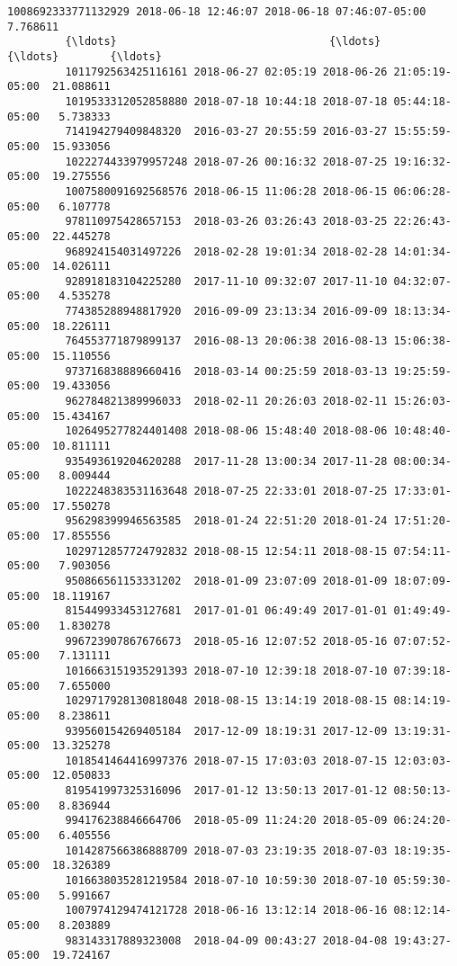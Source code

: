 \documentclass[11pt]{article}
\begin{document}
\begin{Verbatim}[commandchars=\\\{\}]
         1008692333771132929 2018-06-18 12:46:07 2018-06-18 07:46:07-05:00   7.768611   
         {\ldots}                                 {\ldots}                       {\ldots}        {\ldots}   
         1011792563425116161 2018-06-27 02:05:19 2018-06-26 21:05:19-05:00  21.088611   
         1019533312052858880 2018-07-18 10:44:18 2018-07-18 05:44:18-05:00   5.738333   
         714194279409848320  2016-03-27 20:55:59 2016-03-27 15:55:59-05:00  15.933056   
         1022274433979957248 2018-07-26 00:16:32 2018-07-25 19:16:32-05:00  19.275556   
         1007580091692568576 2018-06-15 11:06:28 2018-06-15 06:06:28-05:00   6.107778   
         978110975428657153  2018-03-26 03:26:43 2018-03-25 22:26:43-05:00  22.445278   
         968924154031497226  2018-02-28 19:01:34 2018-02-28 14:01:34-05:00  14.026111   
         928918183104225280  2017-11-10 09:32:07 2017-11-10 04:32:07-05:00   4.535278   
         774385288948817920  2016-09-09 23:13:34 2016-09-09 18:13:34-05:00  18.226111   
         764553771879899137  2016-08-13 20:06:38 2016-08-13 15:06:38-05:00  15.110556   
         973716838889660416  2018-03-14 00:25:59 2018-03-13 19:25:59-05:00  19.433056   
         962784821389996033  2018-02-11 20:26:03 2018-02-11 15:26:03-05:00  15.434167   
         1026495277824401408 2018-08-06 15:48:40 2018-08-06 10:48:40-05:00  10.811111   
         935493619204620288  2017-11-28 13:00:34 2017-11-28 08:00:34-05:00   8.009444   
         1022248383531163648 2018-07-25 22:33:01 2018-07-25 17:33:01-05:00  17.550278   
         956298399946563585  2018-01-24 22:51:20 2018-01-24 17:51:20-05:00  17.855556   
         1029712857724792832 2018-08-15 12:54:11 2018-08-15 07:54:11-05:00   7.903056   
         950866561153331202  2018-01-09 23:07:09 2018-01-09 18:07:09-05:00  18.119167   
         815449933453127681  2017-01-01 06:49:49 2017-01-01 01:49:49-05:00   1.830278   
         996723907867676673  2018-05-16 12:07:52 2018-05-16 07:07:52-05:00   7.131111   
         1016663151935291393 2018-07-10 12:39:18 2018-07-10 07:39:18-05:00   7.655000   
         1029717928130818048 2018-08-15 13:14:19 2018-08-15 08:14:19-05:00   8.238611   
         939560154269405184  2017-12-09 18:19:31 2017-12-09 13:19:31-05:00  13.325278   
         1018541464416997376 2018-07-15 17:03:03 2018-07-15 12:03:03-05:00  12.050833   
         819541997325316096  2017-01-12 13:50:13 2017-01-12 08:50:13-05:00   8.836944   
         994176238846664706  2018-05-09 11:24:20 2018-05-09 06:24:20-05:00   6.405556   
         1014287566386888709 2018-07-03 23:19:35 2018-07-03 18:19:35-05:00  18.326389   
         1016638035281219584 2018-07-10 10:59:30 2018-07-10 05:59:30-05:00   5.991667   
         1007974129474121728 2018-06-16 13:12:14 2018-06-16 08:12:14-05:00   8.203889   
         983143317889323008  2018-04-09 00:43:27 2018-04-08 19:43:27-05:00  19.724167   
         

\end{Verbatim}
\end{document}
